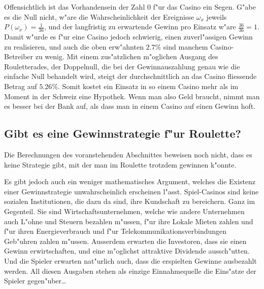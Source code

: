 Offensichtlich ist das Vorhandensein der Zahl $0$ f"ur das Casino
ein Segen. G"abe es die Null nicht, w"are die Wahrscheinlichkeit
der Ereignisse $\omega_x$ jeweils $P(\omega_x)=\frac1{36}$, und
der langfristig zu erwartende Gewinn pro Einsatz w"are $\frac{36}{36}=1$.
Damit w"urde es f"ur eine Casino jedoch schwierig, einen zuverl"assigen
Gewinn zu realisieren, und auch die oben erw"ahnten $2.7\%$ sind manchem
Casino-Betreiber zu wenig. Mit einem zus"atzlichen m"oglichen Ausgang
des Rouletterades, der Doppelnull, die bei der Gewinnauszahlung
genau wie die einfache Null behandelt wird, steigt der durchschnittlich
an das Casino fliessende Betrag auf $5.26\%$. Somit kostet ein Einsatz
in so einem Casino mehr als im Moment in der Schweiz eine Hypothek. Wenn
man also Geld braucht, nimmt man es besser bei der Bank auf, als dass man
in einem Casino auf einen Gewinn hoft.

\subsection{Gibt es eine Gewinnstrategie f"ur Roulette?}
Die Berechnungen des voranstehenden Abschnittes beweisen noch nicht,
dass es keine Strategie gibt, mit der man im Roulette trotzdem
gewinnen k"onnte.

Es gibt jedoch auch ein weniger mathematisches Argument, welches
die Existenz einer Gewinnstrategie unwahrscheinlich erscheinen l"asst.
Spiel-Casinos sind keine sozialen Institutionen, die dazu da sind,
ihre Kundschaft zu bereichern. Ganz im Gegenteil.
Sie sind Wirtschaftsunternehmen, welche wie andere Unternehmen auch
L"ohne und Steuern bezahlen m"ussen, f"ur ihre Lokale Mieten zahlen 
und f"ur ihren Energieverbrauch und f"ur Telekommunikationsverbindungen
Geb"uhren zahlen m"ussen. Ausserdem erwarten die Investoren, dass
sie einen Gewinn erwirtschaften, und eine m"oglichst attraktive
Dividende aussch"utten. Und die Spieler erwarten nat"urlich auch,
dass die erspielten Gewinne ausbezahlt werden.
All diesen Ausgaben stehen als einzige
Einnahmequelle die Eins"atze der Spieler gegen"uber\dots

